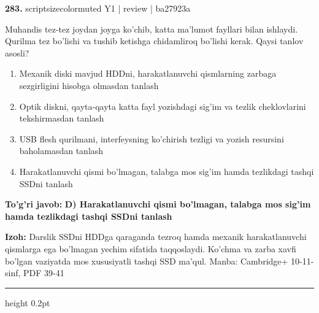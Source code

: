 \documentclass[10pt,a4paper]{article}
\begin{document}
{\bfseries\sffamily\color{ink} 283.} {scriptsizecolor{muted} Y1 | review | ba27923a}
\par
Muhandis tez-tez joydan joyga ko'chib, katta ma'lumot fayllari bilan ishlaydi. Qurilma tez bo'lishi va tushib ketishga chidamliroq bo'lishi kerak. Qaysi tanlov asosli?
\begin{enumerate}[label=\Alph*),leftmargin=9mm]
\item Mexanik diski mavjud HDDni, harakatlanuvchi qismlarning zarbaga sezgirligini hisobga olmasdan tanlash
\item Optik diskni, qayta-qayta katta fayl yozishdagi sig'im va tezlik cheklovlarini tekshirmasdan tanlash
\item USB flesh qurilmani, interfeysning ko'chirish tezligi va yozish resursini baholamasdan tanlash
\item Harakatlanuvchi qismi bo'lmagan, talabga mos sig'im hamda tezlikdagi tashqi SSDni tanlash
\end{enumerate}
\begin{tcolorbox}[enhanced,breakable,colback=teal!4,colframe=teal!60!black,boxrule=0.45pt,arc=1.2mm,left=2.7mm,right=2.7mm,top=1.8mm,bottom=1.8mm,before skip=2mm,after skip=2mm]
{\bfseries\sffamily\color{teal}To'g'ri javob:} \textbf{D) Harakatlanuvchi qismi bo'lmagan, talabga mos sig'im hamda tezlikdagi tashqi SSDni tanlash}
\par\smallskip
{\bfseries Izoh:} Darslik SSDni HDDga qaraganda tezroq hamda mexanik harakatlanuvchi qismlarga ega bo'lmagan yechim sifatida taqqoslaydi. Ko'chma va zarba xavfi bo'lgan vaziyatda mos xususiyatli tashqi SSD ma'qul. Manba: Cambridge+ 10-11-sinf, PDF 39-41
\end{tcolorbox}
\vspace{2mm}\hrule height 0.2pt\vspace{3mm}
\end{document}
